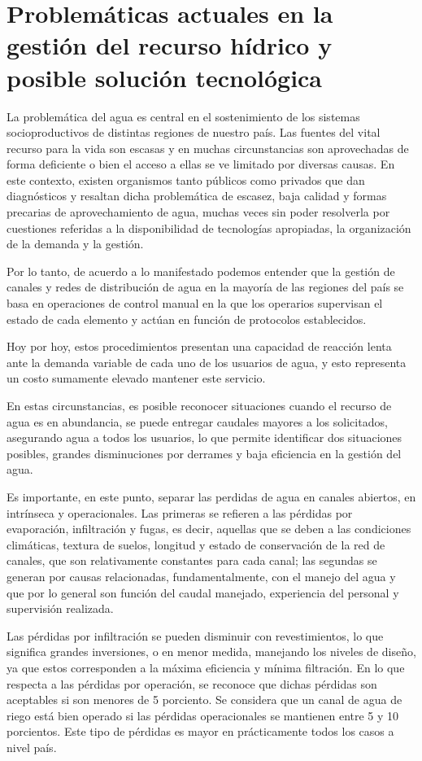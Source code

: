 \section{Problemáticas actuales en la gestión del recurso hídrico y posible solución tecnológica}
La problemática del agua es central en el sostenimiento de los sistemas socioproductivos de distintas regiones de nuestro país. Las fuentes del vital recurso para la vida son escasas y en muchas circunstancias son aprovechadas de forma deficiente o bien el acceso a ellas se ve limitado por diversas causas. En este contexto, existen organismos tanto  públicos como privados que dan diagnósticos y resaltan dicha problemática de escasez, baja calidad y formas precarias de aprovechamiento de agua, muchas veces sin poder resolverla por cuestiones referidas a la disponibilidad de tecnologías apropiadas, la organización de la demanda y la gestión. 
 	 

Por lo tanto, de acuerdo a lo manifestado podemos entender que la gestión de canales y redes de distribución de agua en la mayoría de las regiones del país se basa en operaciones de control manual en la que los operarios supervisan el estado de cada elemento y actúan en función de protocolos establecidos.

Hoy por hoy, estos procedimientos presentan una capacidad de reacción lenta ante la demanda variable de cada uno de los usuarios de agua, y esto representa un costo sumamente elevado mantener este servicio.

En estas circunstancias, es posible reconocer situaciones cuando el recurso de agua es en abundancia, se puede entregar caudales mayores a los solicitados, asegurando agua a todos los usuarios, lo que permite identificar dos situaciones posibles, grandes disminuciones por derrames y baja eficiencia en la gestión del agua.

Es importante, en este punto, separar las perdidas de agua en canales abiertos, en intrínseca y operacionales. Las primeras se refieren a las pérdidas por evaporación, infiltración y fugas, es decir, aquellas que se deben a las
condiciones climáticas, textura de suelos, longitud y estado de conservación de la red de canales, que son relativamente constantes para cada canal; las segundas se generan por causas relacionadas, fundamentalmente, con el manejo del agua y que por lo general son función del caudal manejado, experiencia del personal y supervisión realizada.

Las pérdidas por infiltración se pueden disminuir con revestimientos, lo que significa grandes inversiones, o en menor medida, manejando los niveles de diseño, ya que estos corresponden a la máxima eficiencia y mínima filtración.
En lo que respecta a las pérdidas por operación, se reconoce que dichas pérdidas son aceptables si son menores de 5 porciento. Se considera que un canal de agua de riego está bien operado si las pérdidas operacionales se mantienen entre 5 y 10 porcientos. Este tipo de pérdidas es mayor en prácticamente todos los casos a nivel país.		
		


